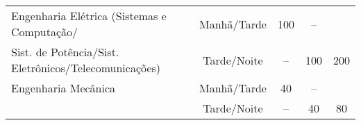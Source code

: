 \begin{table}
\begin{tabularx}{\textwidth}{|X|c|c|c|c|}
		\hline
		Engenharia Elétrica (Sistemas e Computação/           & Manhã/Tarde                     & 100                                 & --                                 &     \\
		Sist. de Potência/Sist. Eletrônicos/Telecomunicações) & Tarde/Noite                     & --                                  & 100                                & 200 \\
		\hline
		Engenharia Mecânica                                   & Manhã/Tarde                     & 40                                  & --                                 &     \\
		                                                      & Tarde/Noite                     & --                                  & 40                                 & 80  \\
		\hline
	\end{tabularx}
\end{table}
